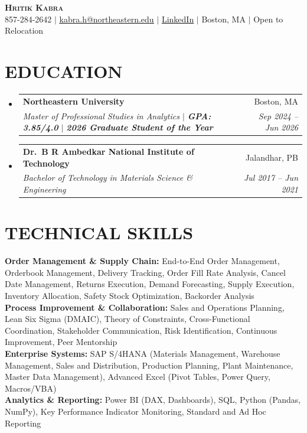 \documentclass[letterpaper,10pt]{article}
\makeatletter
\newcommand{\resumeSubheading}[4]{
  \vspace{-1pt}\item
    \begin{tabular*}{0.97\textwidth}[t]{l@{\extracolsep{\fill}}r}
      \textbf{#1} & #2 \\
      \textit{\small#3} & \textit{\small #4} \\
    \end{tabular*}\vspace{-4pt}
}
\newcommand{\resumeSubHeadingListStart}{\begin{itemize}[leftmargin=0.15in, label={}]}
\newcommand{\resumeSubHeadingListEnd}{\end{itemize}}
\makeatother
\begin{document}
\begin{center}
    {\color{heading}\textbf{\LARGE \scshape Hritik Kabra}} \\ \vspace{1pt}
    \small 857-284-2642 $|$ \href{mailto:kabra.h@northeastern.edu}{\underline{kabra.h@northeastern.edu}} $|$
    \href{https://www.linkedin.com/in/hritikkabra888}{\underline{LinkedIn}} $|$ Boston, MA $|$ Open to Relocation
\end{center}

\section{EDUCATION}
\resumeSubHeadingListStart
\resumeSubheading
{Northeastern University}{Boston, MA}
{Master of Professional Studies in Analytics $|$ \textbf{GPA: 3.85/4.0} $|$ \textbf{2026 Graduate Student of the Year}}{Sep 2024 -- Jun 2026}
\resumeSubheading
{Dr.\ B R Ambedkar National Institute of Technology}{Jalandhar, PB}
{Bachelor of Technology in Materials Science \& Engineering}{Jul 2017 -- Jun 2021}
\resumeSubHeadingListEnd

\section{TECHNICAL SKILLS}
\begin{itemize}[leftmargin=0.15in, label={}]
\small{\item{
\textbf{Order Management \& Supply Chain:} End-to-End Order Management, Orderbook Management, Delivery Tracking, Order Fill Rate Analysis, Cancel Date Management, Returns Execution, Demand Forecasting, Supply Execution, Inventory Allocation, Safety Stock Optimization, Backorder Analysis \\[3pt]
\textbf{Process Improvement \& Collaboration:} Sales and Operations Planning, Lean Six Sigma (DMAIC), Theory of Constraints, Cross-Functional Coordination, Stakeholder Communication, Risk Identification, Continuous Improvement, Peer Mentorship \\[3pt]
\textbf{Enterprise Systems:} SAP S/4HANA (Materials Management, Warehouse Management, Sales and Distribution, Production Planning, Plant Maintenance, Master Data Management), Advanced Excel (Pivot Tables, Power Query, Macros/VBA) \\[3pt]
\textbf{Analytics \& Reporting:} Power BI (DAX, Dashboards), SQL, Python (Pandas, NumPy), Key Performance Indicator Monitoring, Standard and Ad Hoc Reporting
}}
\end{itemize}
\end{document}
